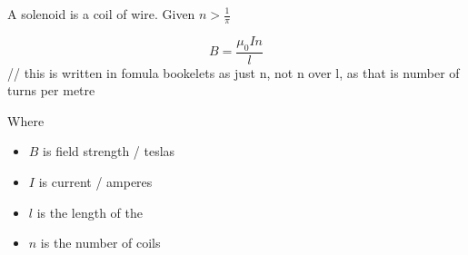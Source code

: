 \documentclass{article}
\begin{document}
A solenoid is a coil of wire. Given $n>\frac{1}{\pi}$

\[B=\frac{\mu_0In}{l}\] // this is written in fomula bookelets as just n, not n over l, as that is number of turns per metre

\noindent Where\begin{itemize}

    \item $B$ is field strength / teslas
    \item $I$ is current / amperes
    \item $l$ is the length of the 
    \item $n$ is the number of coils

\end{itemize}
\end{document}
